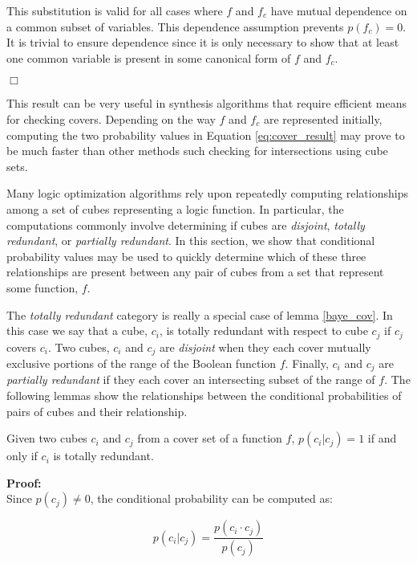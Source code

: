 This substitution is valid for all cases where $f$ and $f_c$ have mutual dependence
on a common subset of variables.  This dependence assumption prevents $p(f_c)=0$.
It is trivial to ensure dependence since it is only necessary to show that at least
one common variable is present in some canonical form of $f$ and $f_c$.

\hfill $\Box$

This result can be very useful in synthesis algorithms that require
efficient means for checking covers.  Depending on the way $f$ and $f_c$
are represented initially, computing the two probability
values in Equation \ref{eq:cover_result} may prove to be much faster
than other methods such checking for intersections using cube sets.

Many logic optimization algorithms rely upon repeatedly computing relationships
among a set of cubes representing a logic function.  In particular, the computations
commonly involve determining if cubes are {\em disjoint}, {\em totally redundant},
or {\em partially redundant}.  In this section, we show that conditional probability
values may be used to quickly determine which of these three relationships are present
between any pair of cubes from a set that represent some function, $f$.

The {\em totally redundant} category is really a special case of lemma \ref{baye_cov}.
In this case we say that a cube, $c_i$, is totally redundant with respect to cube $c_j$
if $c_j$ covers $c_i$.  Two cubes, $c_i$ and $c_j$ are {\em disjoint} when they each cover
mutually exclusive portions of the range of the Boolean function $f$.
Finally, $c_i$ and $c_j$ are {\em partially redundant} if they each cover an intersecting 
subset of the range of $f$.  The following lemmas show the relationships between the
conditional probabilities of pairs of cubes and their relationship.

\begin{lemma}   \label{tot_redun}
Given two cubes $c_i$ and $c_j$ from a cover set of a function $f$,
$p(c_i|c_j)=1$ if and only if $c_i$ is totally redundant.
\end{lemma}

\noindent
{\bf Proof:} \\
Since $p(c_j) \neq 0$, the conditional probability can be computed 
as:

\begin{equation}
p(c_i|c_j) = \frac{p(c_i \cdot c_j)}{p(c_j)} \label{eq:cub_baye}
\end{equation}

